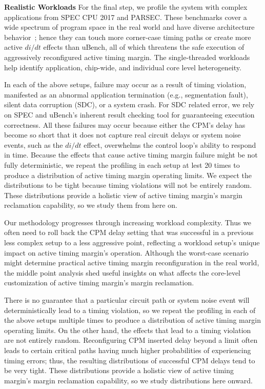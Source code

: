 \textbf{Realistic Workloads} %
For the final step, we profile the system with complex applications from SPEC CPU 2017 and PARSEC. These benchmarks cover a wide spectrum of program space in the real world and have diverse architecture behavior~\cite{song2018spec,bienia2008parsecsplash}; hence they can touch more corner-case timing paths or create more active $di/dt$ effects than uBench, all of which threatens the safe execution of aggressively reconfigured active timing margin. {The single-threaded workloads help identify application, chip-wide, and individual core level heterogeneity.}

In each of the above setups, failure may occur as a result of timing violation, manifested as an abnormal application termination (e.g., segmentation fault), silent data corruption (SDC), or a system crash. For SDC related error, we rely on SPEC and uBench's inherent result checking tool for guaranteeing execution correctness. All these failures may occur because either the CPM's delay has become so short that it does not capture real circuit delays or system noise events, such as the $di/dt$ effect, overwhelms the control loop's ability to respond in time. Because the effects that cause active timing margin failure might be not fully deterministic, we repeat the profiling in each setup at lest 20 times to produce a distribution of active timing margin operating limits. We expect the distributions to be tight because timing violations will not be entirely random. These distributions provide a holistic view of active timing margin's margin reclamation capability, so we study them from here on.

Our methodology progresses through increasing workload complexity. Thus we often need to roll back the CPM delay setting that was successful in a previous less complex setup to a less aggressive point, reflecting a workload setup's unique impact on active timing margin's operation. Although the worst-case scenario might determine practical active timing margin reconfiguration in the real world, the middle point analysis shed useful insights on what affects the core-level customization of active timing margin's margin reclamation.

There is no guarantee that a particular circuit path or system noise event will deterministically lead to a timing violation, so we repeat the profiling in each of the above setups multiple times to produce a distribution of active timing margin operating limits. On the other hand, the effects that lead to a timing violation are not entirely random. Reconfiguring CPM inserted delay beyond a limit often leads to certain critical paths having much higher probabilities of experiencing timing errors; thus, the resulting distributions of successful CPM delays tend to be very tight. These distributions provide a holistic view of active timing margin's margin reclamation capability, so we study distributions here onward.

